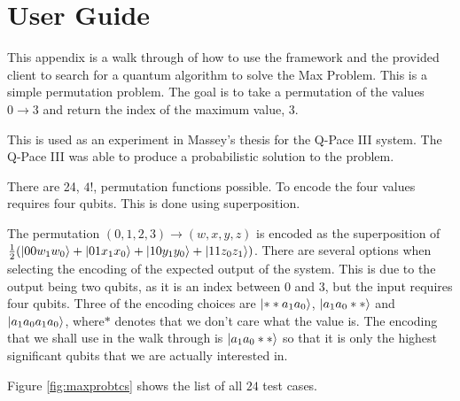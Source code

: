 \chapter{User Guide}
\label{sec:userguide}

This appendix is a walk through of how to use the framework and the provided client to search for a quantum algorithm to solve the Max Problem.
This is a simple permutation problem.
The goal is to take a permutation of the values $0\rightarrow3$ and return the index of the maximum value, $3$.

This is used as an experiment in Massey's thesis\cite{masseythesis} for the Q-Pace III system.
The Q-Pace III was able to produce a probabilistic solution to the problem.

There are 24, $4!$, permutation functions possible.
To encode the four values requires four qubits.
This is done using superposition.

The permutation $(0,1,2,3)\rightarrow(w,x,y,z)$ is encoded as the superposition of $\frac{1}{2}(\left\vert{00w_1w_0}\right\rangle+\left\vert{01x_1x_0}\right\rangle+\left\vert{10y_1y_0}\right\rangle+\left\vert{11z_0z_1}\right\rangle)$.
There are several options when selecting the encoding of the expected output of the system.
This is due to the output being two qubits, as it is an index between $0$ and $3$, but the input requires four qubits.
Three of the encoding choices are $\left\vert{**a_1a_0}\right\rangle$, $\left\vert{a_1a_0**}\right\rangle$ and $\left\vert{a_1a_0a_1a_0}\right\rangle$, where$*$ denotes that we don't care what the value is.
The encoding that we shall use in the walk through is $\left\vert{a_1a_0**}\right\rangle$ so that it is only the highest significant qubits that we are actually interested in.

Figure \ref{fig:maxprobtcs} shows the list of all $24$ test cases.

